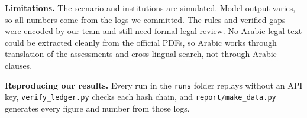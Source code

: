 \documentclass[10pt,twocolumn]{article}
\begin{document}
\textbf{Limitations.} The scenario and institutions are simulated. Model output varies, so all numbers come from the logs we committed. The rules and verified gaps were encoded by our team and still need formal legal review. No Arabic legal text could be extracted cleanly from the official PDFs, so Arabic works through translation of the assessments and cross lingual search, not through Arabic clauses.

\textbf{Reproducing our results.} Every run in the \texttt{runs} folder replays without an API key, \texttt{verify\_ledger.py} checks each hash chain, and \texttt{report/make\_data.py} generates every figure and number from those logs.
\end{document}
